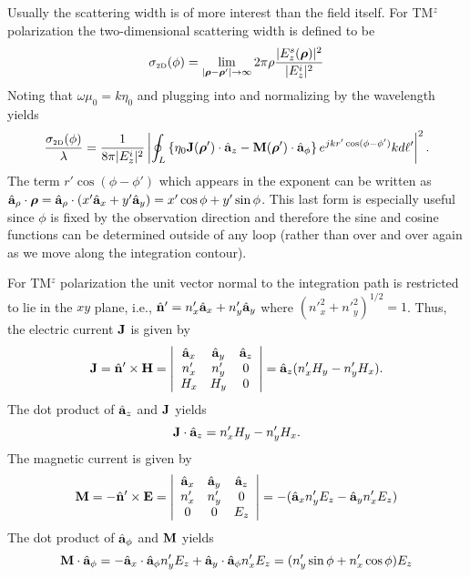 Usually the scattering width is of more interest than the field
itself.  For TM$^z$ polarization the two-dimensional scattering width
is defined to be
\begin{equation}
\sigma_{\mbox{\tiny 2D}}(\phi) = \lim_{|\boldsymbol{\rho}-\boldsymbol{\rho}'|\rightarrow\infty} 2\pi \rho
\frac{|E^s_z(\boldsymbol{\rho})|^2}{|E^i_z|^2} \label{eq:swidth}
\end{equation}
Noting that $\omega\mu_0=k\eta_0$ and plugging  into
 and normalizing by the wavelength yields
\begin{equation}
\frac{\sigma_{\mbox{\tiny 2D}}(\phi)}{\lambda} = \frac{1}{8\pi|E^i_z|^2}
\left|\oint_{L}\left\{\eta_0\mathbf{J}(\boldsymbol{\rho}')\cdot\hat{\mathbf{a}}_{z}
  - \mathbf{M}(\boldsymbol{\rho}')\cdot\hat{\mathbf{a}}_{\phi}\right\}
  e^{jkr'\cos(\phi-\phi')}kd\ell'\right|^2.
\label{eq:stwo}
\end{equation}
The term $r'\cos(\phi-\phi')$ which appears in the
exponent can be written as $\hat{\mathbf{a}}_{\rho}\cdot\boldsymbol{\rho} = \hat{\mathbf{a}}_{\rho}\cdot(x'\hat{\mathbf{a}}_{x}
+ y'\hat{\mathbf{a}}_{y}) = x'\cos\phi + y'\sin\phi$.  This last form is especially
useful since $\phi$ is fixed by the observation direction and
therefore the sine and cosine functions can be determined outside of
any loop (rather than over and over again as we move along the
integration contour).

For TM$^z$ polarization the unit vector normal to the integration
path is restricted to lie in the $xy$ plane, i.e., $\hat{\mathbf{n}}' = n'_x\hat{\mathbf{a}}_{x}
+ n'_y\hat{\mathbf{a}}_{y}$ where $({n'}_x^2+{n'}_y^2)^{1/2}=1$.  Thus, the electric
current $\mathbf{J}$ is given by
\begin{equation}
  \mathbf{J} = \hat{\mathbf{n}}'\times\mathbf{H} =
  \left|
    \begin{array}{ccc}
     \hat{\mathbf{a}}_{x} & \hat{\mathbf{a}}_{y} & \hat{\mathbf{a}}_{z} \\
     n'_x   & n'_y   & 0 \\
     H_x    & H_y    & 0
    \end{array}
  \right|
  = \hat{\mathbf{a}}_{z}(n'_x H_y - n'_y H_x).
\end{equation}
The dot product of $\hat{\mathbf{a}}_{z}$ and $\mathbf{J}$ yields
\begin{equation}
  \mathbf{J} \cdot \hat{\mathbf{a}}_{z} = 
  n'_x H_y - n'_y H_x.
  \label{eq:jvecDotZ}
\end{equation}
The magnetic current is given by 
\begin{equation}
  \mathbf{M} = -\hat{\mathbf{n}}'\times\mathbf{E} =
  \left|
    \begin{array}{ccc}
     \hat{\mathbf{a}}_{x} & \hat{\mathbf{a}}_{y} & \hat{\mathbf{a}}_{z} \\
     n'_x   & n'_y   & 0 \\
     0      & 0      & E_z
    \end{array}
  \right|
  = -(\hat{\mathbf{a}}_{x} n'_y E_z - \hat{\mathbf{a}}_{y} n'_x E_z)
\end{equation}
The dot product of $\hat{\mathbf{a}}_{\phi}$ and $\mathbf{M}$ yields
\begin{equation}
  \mathbf{M}\cdot\hat{\mathbf{a}}_{\phi} = 
    -\hat{\mathbf{a}}_{x}\cdot\hat{\mathbf{a}}_{\phi} n'_y E_z +
     \hat{\mathbf{a}}_{y}\cdot\hat{\mathbf{a}}_{\phi} n'_x E_z =
    (n'_y \sin\phi + n'_x \cos\phi) E_z
  \label{eq:mvecDotPhi}
\end{equation}


